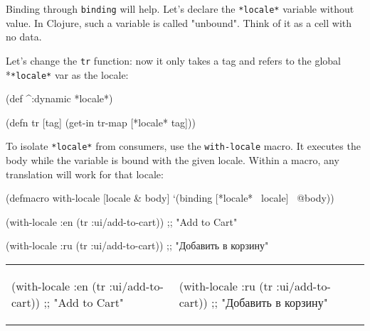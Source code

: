 Binding through \verb|binding| will help.
Let's declare the \verb|*locale*| variable without value. In Clojure, such a variable is called "unbound". 
Think of it as a cell with no data.

Let's change the \verb|tr| function: now it only takes a tag and refers to the global *\verb|*locale*| var as the locale:

\begin{english}
  \begin{clojure}
(def ^:dynamic *locale*)

(defn tr [tag]
  (get-in tr-map [*locale* tag]))
  \end{clojure}
\end{english}


To isolate \verb|*locale*| from consumers, use the \verb|with-locale| macro.
It executes the body while the variable is bound with the given locale. 
Within a macro, any translation will work for that locale:

\begin{english}
  \begin{clojure}
(defmacro with-locale
  [locale & body]
  `(binding [*locale* ~locale]
     ~@body))
  \end{clojure}
\end{english}

\ifx\DEVICETYPE\MOBILE

\begin{clojure}
(with-locale :en
  (tr :ui/add-to-cart))
;; "Add to Cart"
\end{clojure}

\splitter

\begin{clojure}
(with-locale :ru
  (tr :ui/add-to-cart))
;; "Добавить в корзину"
\end{clojure}

\else


\noindent
\begin{tabular}{ @{}p{5cm} @{}p{5cm} }

  \begin{clojure}
(with-locale :en
  (tr :ui/add-to-cart))
;; "Add to Cart"
  \end{clojure}

&

  \begin{clojure}
(with-locale :ru
  (tr :ui/add-to-cart))
;; "Добавить в корзину"
  \end{clojure}

\end{tabular}

